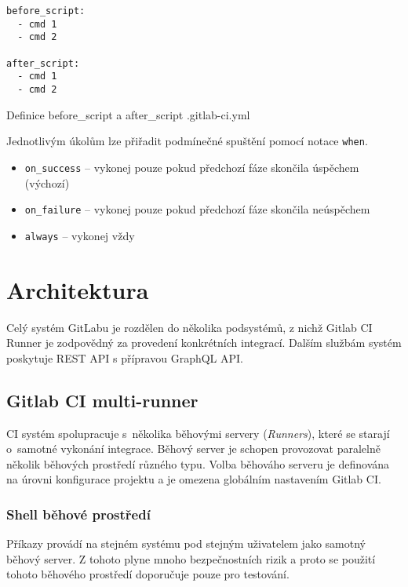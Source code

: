 \begin{listing}[ht]
\begin{verbatim}
before_script:
  - cmd 1
  - cmd 2

after_script:
  - cmd 1
  - cmd 2
\end{verbatim}
\caption{Definice before\_script a after\_script .gitlab-ci.yml}
\end{listing}

Jednotlivým úkolům lze přiřadit podmínečné spuštění pomocí notace \verb|when|.

\begin{itemize}
  \item \verb|on_success| -- vykonej pouze pokud předchozí fáze skončila úspěchem (výchozí) 
  \item \verb|on_failure| -- vykonej pouze pokud předchozí fáze skončila neúspěchem
  \item \verb|always| -- vykonej vždy
\end{itemize}

\section{Architektura}

Celý systém GitLabu je rozdělen do několika podsystémů, z nichž Gitlab CI Runner je zodpovědný za provedení konkrétních integrací.
Dalším službám systém poskytuje REST API s přípravou GraphQL API.
\cite{gitlab_architecture}
\cite{gitlab_api}

\subsection{Gitlab CI multi-runner}

CI systém spolupracuje s~několika běhovými servery (\textit{Runners}), které se starají o~samotné vykonání integrace.
Běhový server je schopen provozovat paralelně několik běhových prostředí různého typu.
Volba běhováho serveru je definována na úrovni konfigurace projektu a je omezena globálním nastavením Gitlab CI.


\subsubsection{Shell běhové prostředí}

Příkazy provádí na stejném systému pod stejným uživatelem jako samotný běhový server.
Z tohoto plyne mnoho bezpečnostních rizik a proto se použití tohoto běhového prostředí doporučuje pouze pro testování.

